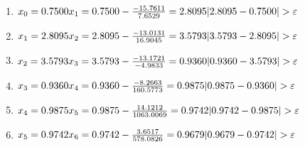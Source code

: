 \documentclass{article}
\begin{document}
\begin{enumerate}[label= итерация \arabic{*}:]
\item
\begin{math}
  x_{0} = 0.7500\\
  x_{1} = 0.7500 - \frac{-15.7611}{7.6529} = 2.8095\\
  |2.8095 -0.7500| > \varepsilon\\
\end{math}

\item
\begin{math}
  x_{1} = 2.8095\\
  x_{2} = 2.8095 - \frac{-13.0131}{16.9045} = 3.5793\\
  |3.5793 -2.8095| > \varepsilon\\
\end{math}

\item
\begin{math}
  x_{2} = 3.5793\\
  x_{3} = 3.5793 - \frac{-13.1721}{-4.9833} = 0.9360\\
  |0.9360 -3.5793| > \varepsilon\\
\end{math}

\item
\begin{math}
  x_{3} = 0.9360\\
  x_{4} = 0.9360 - \frac{-8.2663}{160.5773} = 0.9875\\
  |0.9875 -0.9360| > \varepsilon\\
\end{math}

\item
\begin{math}
  x_{4} = 0.9875\\
  x_{5} = 0.9875 - \frac{14.1212}{1063.0069} = 0.9742\\
  |0.9742 -0.9875| > \varepsilon\\
\end{math}

\item
\begin{math}
  x_{5} = 0.9742\\
  x_{6} = 0.9742 - \frac{3.6517}{578.0826} = 0.9679\\
  |0.9679 -0.9742| > \varepsilon\\
\end{math}
\end{enumerate}
\end{document}
